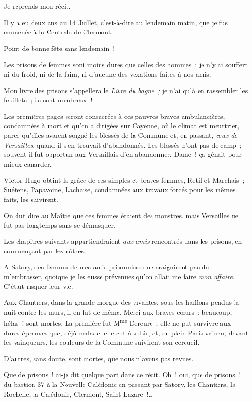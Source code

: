 \documentclass[french,twoside]{book} %
\newcommand\chaptercont{} %
\begin{document}
\chaptercont
\noindent Je reprends mon récit.\par
Il y a eu deux ans au 14 Juillet, c’est-à-dire au lendemain matin, que je fus emmenée à la Centrale de Clermont.\par
Point de bonne fête sans lendemain !\par
Les prisons de femmes sont moins dures que celles des hommes : je n’y ai souffert ni du froid, ni de la faim, ni d’aucune des vexations faites à nos amis.\par
Mon livre des prisons s’appellera le \emph{Livre du bagne ;} je n’ai qu’à en rassembler les feuillets ; ils sont nombreux !\par
Les premières pages seront consacrées à ces pauvres braves ambulancières, condamnées à mort et qu’on a dirigées sur Cayenne, où le climat est meurtrier, parce qu’elles avaient soigné les blessés de la Commune et, en passant, \emph{ceux de Versailles}, quand il s’en trouvait d’abandonnés. Les blessés n’ont pas de camp ; souvent il fut  opportun aux Versaillais d’en abandonner. Dame ! ça gênait pour mieux canarder.\par
Victor Hugo obtint la grâce de ces simples et braves femmes, Retif et Marchais ; Suétens, Papavoine, Lachaise, condamnées aux travaux forcés pour les mêmes faits, les suivirent.\par
On dut dire au Maître que ces femmes étaient des monstres, mais Versailles ne fut pas longtemps sans se démasquer.\par
Les chapitres suivants appartiendraient \emph{aux amis} rencontrés dans les prisons, en commençant par les nôtres.\par
A Satory, des femmes de mes amis prisonnières ne craignirent pas de m’embrasser, quoique je les eusse prévenues qu’on allait me faire \emph{mon affaire}. C’était risquer leur vie.\par
Aux Chantiers, dans la grande morgue des vivantes, sous les haillons pendus la nuit contre les murs, il en fut de même. Merci aux braves cœurs ; beaucoup, hélas ! sont mortes. La première fut M\textsuperscript{me} Dereure ; elle ne put survivre aux dures épreuves que, déjà malade, elle eut à subir, et, en plein Paris vaincu, devant les vainqueurs, les couleurs de la Commune suivirent son cercueil.\par
D’autres, sans doute, sont mortes, que nous n’avons pas revues.\par
 Que de prisons ! ai-je dit quelque part dans ce récit. Oh ! oui, que de prisons ! du bastion 37 à la Nouvelle-Calédonie en passant par Satory, les Chantiers, la Rochelle, la Calédonie, Clermont, Saint-Lazare !…\par
\end{document}
